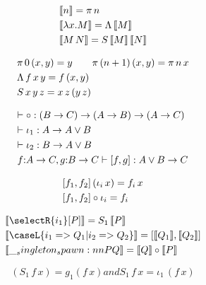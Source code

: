 \begin{equation*}
  \begin{lgathered}
    \sem{n} = \pi\,n \\
    \sem{\lambda x.M} = \Lambda\,\sem{M} \\
    \sem{M\,N} = S\,\sem{M}\,\sem{N}
  \end{lgathered}
\end{equation*}

\begin{equation*}
  \begin{lgathered}
    \pi\,0\,(x,y) = y \qquad \pi\,(n+1)\,(x,y) = \pi\,n\,x \\
    \Lambda\,f\,x\,y = f\,(x,y) \\
    S\,x\,y\,z = x\,z\,(y\,z)
  \end{lgathered}
\end{equation*}


\begin{equation*}
  \begin{lgathered}
    \vdash \circ : (B \to C) \to (A \to B) \to (A \to C) \\
    \vdash \iota_1 : A \to A \lor B \\
    \vdash \iota_2 : B \to A \lor B \\
    f{:}A \to C, g{:}B \to C \vdash [f,g] : A \lor B \to C
  \end{lgathered}
\end{equation*}

\begin{equation*}
  \begin{lgathered}
    [f_1,f_2]\,(\iota_i\,x) = f_i\,x \\
    [f_1,f_2] \circ \iota_i = f_i
  \end{lgathered}
\end{equation*}


\begin{equation*}
  \begin{lgathered}
    \sem{\selectR{i_1}[P]} = S_1\,\sem{P} \\
    \sem{\caseL{i_1 => Q_1 | i_2 => Q_2}} = [\sem{Q_1}, \sem{Q_2}] \\
    \sem{\spawn{P}{Q}} = \sem{Q} \circ \sem{P}
  \end{lgathered}
\end{equation*}

\begin{equation*}
  [g_1, g_2](S_1\,f\,x) = g_1(f\,x) and S_1\,f\,x = \iota_1\,(f\,x)
\end{equation*}

